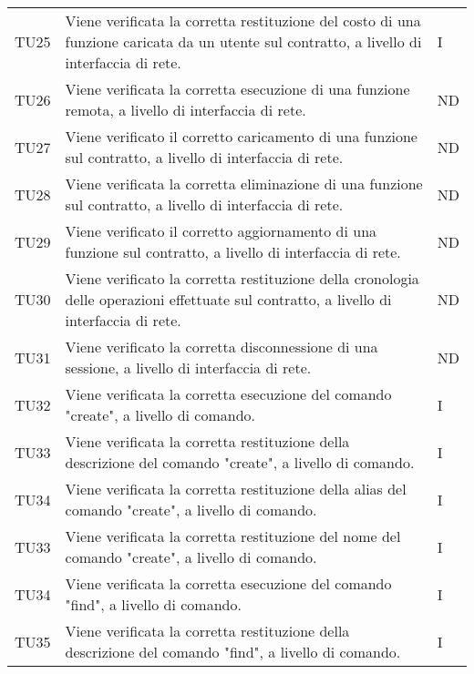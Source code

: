 \begin{longtable}{|C{1.5cm}|C{10cm}|C{1.5cm}|}
	TU25 &
	Viene verificata la corretta restituzione del costo di una funzione caricata da un utente sul contratto, a livello di interfaccia di rete.  &
	I \\
	
	TU26 &
	Viene verificata la corretta esecuzione di una funzione remota, a livello di interfaccia di rete.  &
	ND \\
	
	TU27 &
	Viene verificato il corretto caricamento di una funzione sul contratto, a livello di interfaccia di rete.  &
	ND \\
	
	TU28 &
	Viene verificata la corretta eliminazione di una funzione sul contratto, a livello di interfaccia di rete.  &
	ND \\
	
	TU29 &
	Viene verificato il corretto aggiornamento di una funzione sul contratto, a livello di interfaccia di rete.  &
	ND \\
	
	TU30 &
	Viene verificato la corretta restituzione della cronologia delle operazioni effettuate sul contratto, a livello di interfaccia di rete.  &
	ND \\
	
	TU31 &
	Viene verificato la corretta disconnessione di una sessione, a livello di interfaccia di rete.  &
	ND \\
	
	TU32 &
	Viene verificata la corretta esecuzione del comando "create", a livello di comando.  &
	I \\
	
	TU33 &
	Viene verificata la corretta restituzione della descrizione del comando "create", a livello di comando.  &
	I \\
	
	TU34 &
	Viene verificata la corretta restituzione della alias del comando "create", a livello di comando.  &
	I \\
	
	TU33 &
	Viene verificata la corretta restituzione del nome del comando "create", a livello di comando.  &
	I \\
	
	TU34 &
	Viene verificata la corretta esecuzione del comando "find", a livello di comando.  &
	I \\
	
	TU35 &
	Viene verificata la corretta restituzione della descrizione del comando "find", a livello di comando.  &
	I \\
	

\end{longtable}

